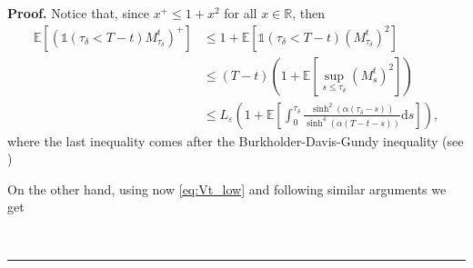 \documentclass{tufte-handout}
\newcommand{\E}{\mathbb{E}} %
\newcommand{\R}{\mathbb{R}} %
\newcommand{\dif}{\mathrm{d}}
\newenvironment{pf}[1][Proof]{\textbf{#1.} }{\ \rule{0.5em}{0.5em}}
\begin{document}
\begin{pf}
		Notice that, since $x^+ \leq 1 + x^2$ for all $x\in \R$, then
		\begin{align*}
			\E\left[\left(\mathbb{1}(\tau_\delta < T - t)M_{\tau_\delta}^t\right)^+\right] &\leq 1 + \E\left[\mathbb{1}(\tau_\delta < T - t)\left(M_{\tau_\delta}^t\right)^2\right] \\
			&\leq (T - t)\left(1 + \E\left[\sup_{s\leq \tau_\delta}\left(M_s^t\right)^2\right]\right) \\
			&\leq L_\varepsilon\left(1 + \E\left[\int_0^{\tau_\delta} \frac{\sinh^{2}(\alpha(\tau_\delta - s))}{\sinh^{4}(\alpha(T - t - s))} \dif s\right]\right),
		\end{align*}
		where the last inequality comes after the Burkholder-Davis-Gundy inequality (see \citet[Corollary 4.2]{revuz_continuous_1999})
		
		On the other hand, using now \eqref{eq:Vt_low} and following similar arguments we get

\end{pf}
\end{document}
